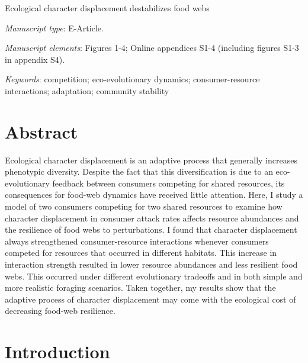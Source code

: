 \documentclass[11pt,]{article}
\author{}
\date{\vspace{-2.5em}}
\begin{document}
\vspace*{0.1cm}

\begin{center} \LARGE Ecological character displacement destabilizes food webs \end{center}

\bigskip

\emph{Manuscript type}: E-Article.

\bigskip

\emph{Manuscript elements}: Figures 1-4; Online appendices S1-4
(including figures S1-3 in appendix S4).

\bigskip

\emph{Keywords}: competition; eco-evolutionary dynamics;
consumer-resource interactions; adaptation; community stability

\linenumbers{} \modulolinenumbers[2]

\section{Abstract}\label{abstract}

Ecological character displacement is an adaptive process that generally
increases phenotypic diversity. Despite the fact that this
diversification is due to an eco-evolutionary feedback between consumers
competing for shared resources, its consequences for food-web dynamics
have received little attention. Here, I study a model of two consumers
competing for two shared resources to examine how character displacement
in consumer attack rates affects resource abundances and the resilience
of food webs to perturbations. I found that character displacement
always strengthened consumer-resource interactions whenever consumers
competed for resources that occurred in different habitats. This
increase in interaction strength resulted in lower resource abundances
and less resilient food webs. This occurred under different evolutionary
tradeoffs and in both simple and more realistic foraging scenarios.
Taken together, my results show that the adaptive process of character
displacement may come with the ecological cost of decreasing food-web
resilience.

\newpage

\section{Introduction}\label{introduction}
\end{document}
